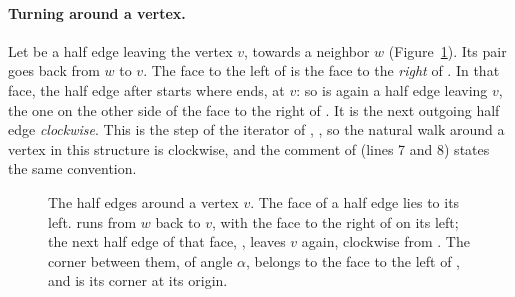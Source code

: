 \paragraph{Turning around a vertex.} Let  be a half edge leaving the vertex $v$, towards a neighbor $w$ (Figure~\ref{fig:t3_halfedge}). Its pair  goes back from $w$ to $v$. The face to the left of  is the face to the \emph{right} of . In that face, the half edge after  starts where  ends, at $v$: so  is again a half edge leaving $v$, the one on the other side of the face to the right of . It is the next outgoing half edge \emph{clockwise}. This is the step of the iterator  of , , so the natural walk around a vertex in this structure is clockwise, and the comment of  (lines 7 and 8) states the same convention.
\begin{figure}[t]
\centering
{}
\caption{The half edges around a vertex $v$. The face of a half edge lies to its left.  runs from $w$ back to $v$, with the face to the right of  on its left; the next half edge of that face, , leaves $v$ again, clockwise from . The corner between them, of angle $\alpha$, belongs to the face to the left of , and is its corner at its origin.}
\label{fig:t3_halfedge}
\end{figure}


